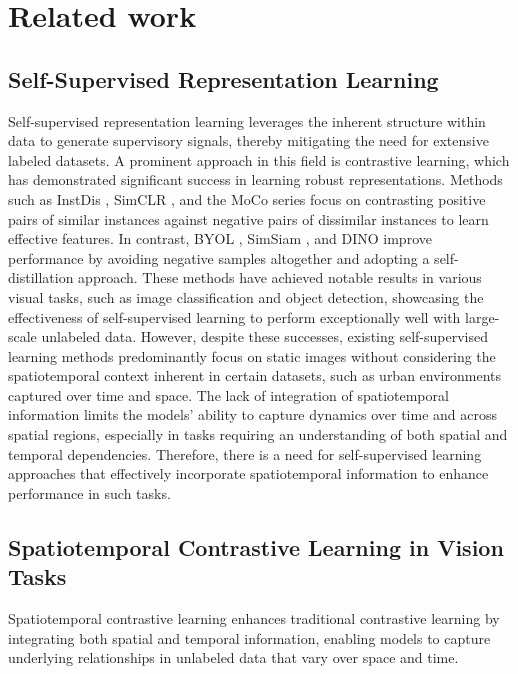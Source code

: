 \section{Related work}
\subsection{Self-Supervised Representation Learning}
Self-supervised representation learning leverages the inherent structure within data to generate supervisory signals, thereby mitigating the need for extensive labeled datasets. A prominent approach in this field is contrastive learning, which has demonstrated significant success in learning robust representations. Methods such as InstDis \citep{wu2018unsupervised}, SimCLR \citep{chen2020Simple}, and the MoCo series \citep{he2020Momentum, chen2021empirical} focus on contrasting positive pairs of similar instances against negative pairs of dissimilar instances to learn effective features. In contrast, BYOL \citep{grill2020bootstrap}, SimSiam \citep{chen2021Exploring}, and DINO \citep{caron2021emerging} improve performance by avoiding negative samples altogether and adopting a self-distillation approach. These methods have achieved notable results in various visual tasks, such as image classification and object detection, showcasing the effectiveness of self-supervised learning to perform exceptionally well with large-scale unlabeled data. However, despite these successes, existing self-supervised learning methods predominantly focus on static images without considering the spatiotemporal context inherent in certain datasets, such as urban environments captured over time and space. The lack of integration of spatiotemporal information limits the models' ability to capture dynamics over time and across spatial regions, especially in tasks requiring an understanding of both spatial and temporal dependencies. Therefore, there is a need for self-supervised learning approaches that effectively incorporate spatiotemporal information to enhance performance in such tasks.

\subsection{Spatiotemporal Contrastive Learning in Vision Tasks}
Spatiotemporal contrastive learning enhances traditional contrastive learning by integrating both spatial and temporal information, enabling models to capture underlying relationships in unlabeled data that vary over space and time.

